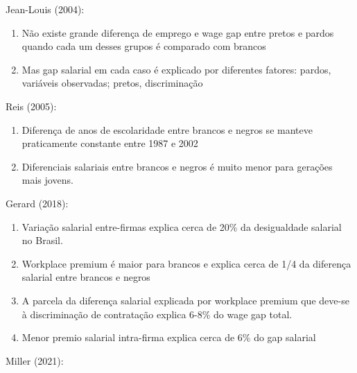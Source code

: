 \documentclass[12pt]{article}
\begin{document}
\par Jean-Louis (2004):

\begin{enumerate}
    \item Não existe grande diferença de emprego e wage gap entre pretos e pardos quando cada um desses grupos é comparado com brancos
    \item Mas gap salarial em cada caso é explicado por diferentes fatores: pardos, variáveis observadas; pretos, discriminação
\end{enumerate}

\par Reis (2005):

\begin{enumerate}
    \item Diferença de anos de escolaridade entre brancos e negros se manteve praticamente constante entre 1987 e 2002
    \item Diferenciais salariais entre brancos e negros é muito menor para gerações mais jovens.
\end{enumerate}

\par Gerard (2018):

\begin{enumerate}
    \item Variação salarial entre-firmas explica cerca de 20\% da desigualdade salarial no Brasil.
    \item Workplace premium é maior para brancos e explica cerca de 1/4 da diferença salarial entre brancos e negros
    \item A parcela da diferença salarial explicada por workplace premium que deve-se à dis\-cri\-mi\-na\-ção de contratação explica 6-8\% do wage gap total.
    \item Menor premio salarial intra-firma explica cerca de 6\% do gap salarial
\end{enumerate}


\par Miller (2021):
\end{document}
